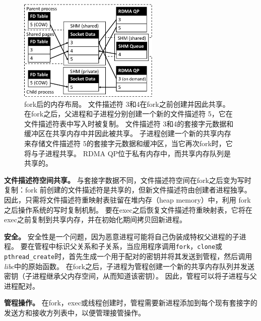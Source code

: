 \begin{figure}[htbp]
	\centering
	\includegraphics[width=0.6\textwidth]{images/fork_memory}
	\caption{fork后的内存布局。 文件描述符 3和4在fork之前创建并因此共享。 在fork之后，父进程和子进程分别创建一个新的文件描述符 5，它在文件描述符表中写入时被复制。 文件描述符 3和4的套接字元数据和缓冲区在共享内存中并因此被共享。 子进程创建一个新的共享内存来存储文件描述符 5的套接字元数据和缓冲区，当它再次fork时，它将与子进程共享。 RDMA QP位于私有内存中，而共享内存队列是共享的。}
	\label{socksdirect:fig:fork-memory}
\end{figure}


\textbf {文件描述符空间共享。}
与套接字数据不同，文件描述符空间在fork之后变为写时复制：fork 前创建的文件描述符是共享的，但新文件描述符由创建者进程独享。
因此，只需将文件描述符重映射表驻留在堆内存（heap memory）中，利用 fork 之后操作系统的写时复制机制。
要在exec之后恢复文件描述符重映射表，它将在exec之前复制到共享内存，并在\libipc {}初始化期间拷贝回新进程。

\textbf{安全。}
安全性是一个问题，因为恶意进程可能将自己伪装成特权父进程的子进程。
要在管程中标识父关系和子关系，当应用程序调用\texttt {fork}，\texttt {clone}或\texttt {pthread\_create}时，\libipc {}首先生成一个用于配对的密钥并将其发送到管程，然后调用\emph {libc}中的原始函数。
在fork之后，子进程为管程创建一个新的共享内存队列并发送密钥（子进程继承父内存空间，从而知道该密钥）。
因此，管程可以将子进程与父进程配对。

\textbf {管程操作。}
在fork，exec或线程创建时，管程需要新进程添加到每个现有套接字的发送方和接收方列表中，以便管理接管操作。


